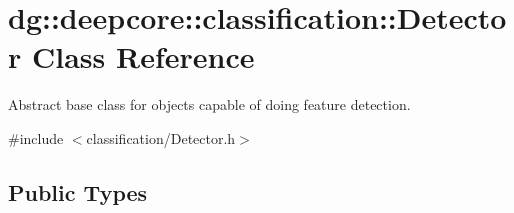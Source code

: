 \hypertarget{classdg_1_1deepcore_1_1classification_1_1_detector}{}\section{dg\+:\+:deepcore\+:\+:classification\+:\+:Detector Class Reference}
\label{classdg_1_1deepcore_1_1classification_1_1_detector}


Abstract base class for objects capable of doing feature detection.  




{\ttfamily \#include $<$classification/\+Detector.\+h$>$}

\subsection*{Public Types}
